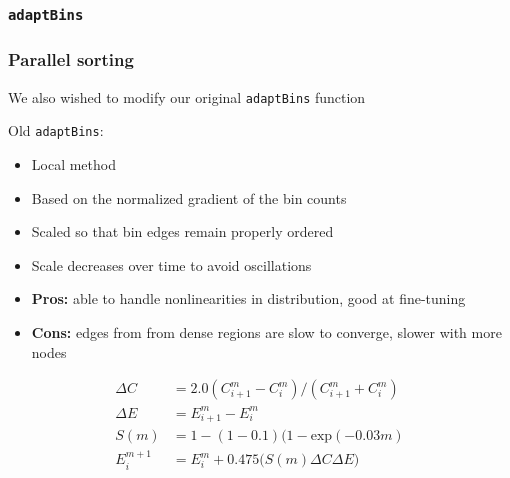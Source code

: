 \documentclass[usernames,dvipsnames]{beamer}
\begin{document}
\subsubsection{\texttt{adaptBins}}

\begin{frame}
	\frametitle{Parallel sorting}
	
	We also wished to modify our original \texttt{adaptBins} function
	
	
	\begin{block}{Old \texttt{adaptBins}:}
		\begin{itemize}
			\item Local method
			\item Based on the normalized gradient of the bin counts
			\item Scaled so that bin edges remain properly ordered
			\item Scale decreases over time to avoid oscillations
			\item \textbf{Pros:} able to handle nonlinearities in distribution, good at fine-tuning
			\item \textbf{Cons:} edges from from dense regions are slow to converge, slower with more nodes
		\end{itemize}
	\end{block}
	
	\vspace{-10pt}
	
	\begin{equation}
		\begin{split}
			\Delta C & = 2.0 ( C^{m}_{i+1} - C^{m}_i ) / ( C^{m}_{i+1} + C^{m}_i ) \\
			\Delta E & = E^m_{i+1} - E^m_i \\
			S(m) & = 1 - (1 - 0.1) (1 - \textrm{exp}(-0.03 m) \\
			E^{m+1}_i & = E^m_i + 0.475 \big( S(m) \Delta C \Delta E \big)
		\end{split}
	\end{equation}
	
\end{frame}
\end{document}
